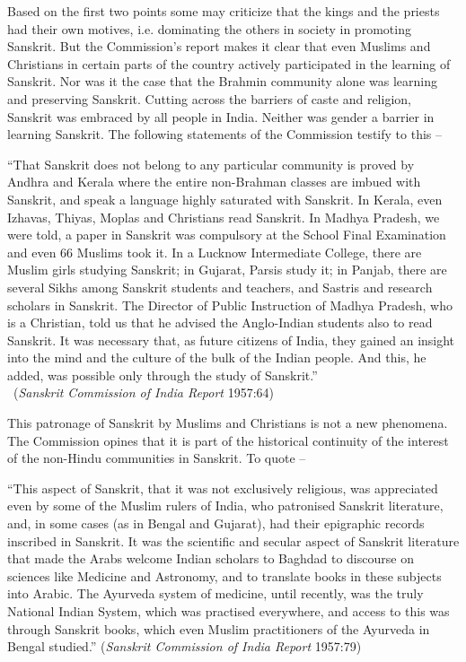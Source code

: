 Based on the first two points some may criticize that the kings and the priests had their own motives, i.e. dominating the others in society in promoting Sanskrit.  But the Commission’s report makes it clear that even Muslims and Christians in certain parts of the country actively participated in the learning of Sanskrit. Nor was it the case that the Brahmin community alone was learning and preserving Sanskrit. Cutting across the barriers of caste and religion, Sanskrit was embraced by all people in India. Neither was gender a barrier in learning Sanskrit. The following statements of the Commission testify to this – 
\begin{myquote}
\eleven
“That Sanskrit does not belong to any particular community is proved by Andhra and Kerala where the entire non-Brahman classes are imbued with Sanskrit, and speak a language highly saturated with Sanskrit. In Kerala, even Izhavas, Thiyas, Moplas and Christians read Sanskrit. In Madhya Pradesh, we were told, a paper in Sanskrit was compulsory at the School Final Examination and even 66 Muslims took it. In a Lucknow Intermediate College, there are Muslim girls studying Sanskrit; in Gujarat, Parsis study it; in Panjab, there are several Sikhs among Sanskrit students and teachers, and Sastris and research scholars in Sanskrit. The Director of Public Instruction of Madhya Pradesh, who is a Christian, told us that he advised the Anglo-Indian students also to read Sanskrit. It was necessary that, as future citizens of India, they gained an insight into the mind and the culture of the bulk of the Indian people. And this, he added, was possible only through the study of Sanskrit.”\\[-15pt]

~\hfill ({\sl Sanskrit Commission of India Report} 1957:64)
\end{myquote}

This patronage of Sanskrit by Muslims and Christians is not a new phenomena. The Commission opines that it is part of the historical continuity of the interest of the non-Hindu communities in Sanskrit. To quote – 
\begin{myquote}
\eleven
“This aspect of Sanskrit, that it was not exclusively religious, was appreciated even by some of the Muslim rulers of India, who patronised Sanskrit literature, and, in some cases (as in Bengal and Gujarat), had their epigraphic records inscribed in Sanskrit. It was the scientific and secular aspect of Sanskrit literature that made the Arabs welcome Indian scholars to Baghdad to discourse on sciences like Medicine and Astronomy, and to translate books in these subjects into Arabic. The Ayurveda system of medicine, until recently, was the truly National Indian System, which was practised everywhere, and access to this was through Sanskrit books, which even Muslim practitioners of the Ayurveda in Bengal studied.”  
({\sl Sanskrit Commission of India Report} 1957:79)
\end{myquote}

